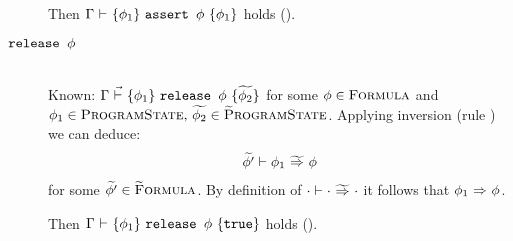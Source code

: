 \begin{proofatend}
\begin{description}
        Then $\thoare{\Gamma}{\phi_1}{\sAssert {$\phi$}}{\phi_1}$ holds ().
        
        
        \item[$\sRelease {$\phi$}$]~\\
        Known: $\dgthoare{\Gamma}{\phi_1}{\sRelease {$\phi$}}{\grad{\phi_2}}$ for some $\phi \in \setFormula$ and $\phi_1 \in \setProgramState,\, \grad{\phi_2} \in \setGProgramState$.
        Applying inversion (rule ) we can deduce:
        \begin{gather*}
        \gphiImpliesEv{\phi_1}{\phi}{\grad{\phi'}}
        \end{gather*}
        for some $\grad{\phi'} \in \setGFormula$.
        By definition of $\gphiImpliesEv{\cdot}{\cdot}{\cdot}$ it follows that $\phiImplies{\phi_1}{\phi}$.
        
        Then $\thoare{\Gamma}{\phi_1}{\sRelease {$\phi$}}{\phiTrue}$ holds ().
    \end{description}
\end{proofatend}


